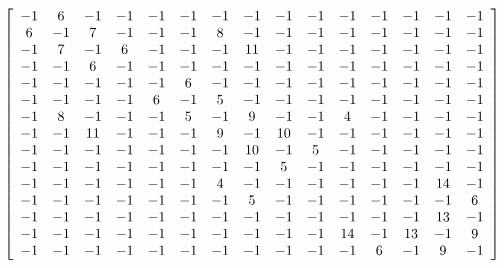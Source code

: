 \documentclass[12pt]{article}
\begin{document}
    \[
        \left[
            \begin{array}{*{15}c}
                -1 & 6 & -1 & -1 & -1 & -1 & -1 & -1 & -1 & -1 & -1 & -1 & -1 & -1 & -1 \\
                6 & -1 & 7 & -1 & -1 & -1 & 8 & -1 & -1 & -1 & -1 & -1 & -1 & -1 & -1 \\
                -1 & 7 & -1 & 6 & -1 & -1 & -1 & 11 & -1 & -1 & -1 & -1 & -1 & -1 & -1 \\
                -1 & -1 & 6 & -1 & -1 & -1 & -1 & -1 & -1 & -1 & -1 & -1 & -1 & -1 & -1 \\
                -1 & -1 & -1 & -1 & -1 & 6 & -1 & -1 & -1 & -1 & -1 & -1 & -1 & -1 & -1 \\
                -1 & -1 & -1 & -1 & 6 & -1 & 5 & -1 & -1 & -1 & -1 & -1 & -1 & -1 & -1 \\
                -1 & 8 & -1 & -1 & -1 & 5 & -1 & 9 & -1 & -1 & 4 & -1 & -1 & -1 & -1 \\
                -1 & -1 & 11 & -1 & -1 & -1 & 9 & -1 & 10 & -1 & -1 & -1 & -1 & -1 & -1 \\
                -1 & -1 & -1 & -1 & -1 & -1 & -1 & 10 & -1 & 5 & -1 & -1 & -1 & -1 & -1 \\
                -1 & -1 & -1 & -1 & -1 & -1 & -1 & -1 & 5 & -1 & -1 & -1 & -1 & -1 & -1 \\
                -1 & -1 & -1 & -1 & -1 & -1 & 4 & -1 & -1 & -1 & -1 & -1 & -1 & 14 & -1 \\
                -1 & -1 & -1 & -1 & -1 & -1 & -1 & 5 & -1 & -1 & -1 & -1 & -1 & -1 & 6 \\
                -1 & -1 & -1 & -1 & -1 & -1 & -1 & -1 & -1 & -1 & -1 & -1 & -1 & 13 & -1 \\
                -1 & -1 & -1 & -1 & -1 & -1 & -1 & -1 & -1 & -1 & 14 & -1 & 13 & -1 & 9 \\
                -1 & -1 & -1 & -1 & -1 & -1 & -1 & -1 & -1 & -1 & -1 & 6 & -1 & 9 & -1 \\
            \end{array}
        \right]
    \]
\end{document}
